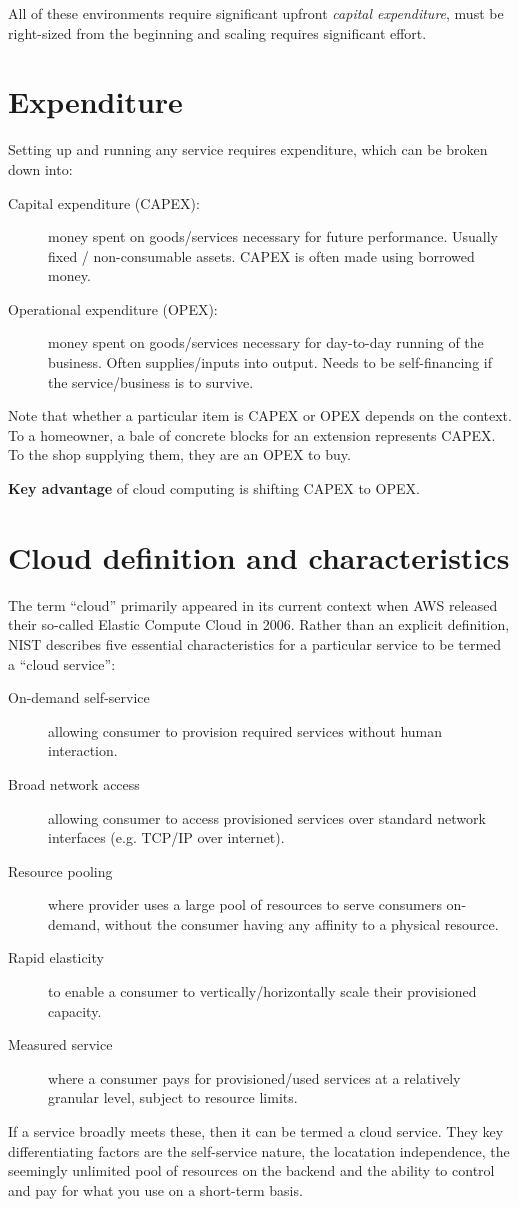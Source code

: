 \documentclass{pgnotes}
\begin{document}
All of these environments require significant upfront \textit{capital expenditure}, must be right-sized from the beginning and scaling requires significant effort.


\section{Expenditure}
\label{sec:expenditure}

Setting up and running any service requires expenditure, which can be broken down into: 
\begin{description}
\item[Capital expenditure (CAPEX):] money spent on goods/services necessary for future performance. Usually fixed / non-consumable assets. CAPEX is often made using borrowed money.
\item[Operational expenditure (OPEX):] money spent on goods/services necessary for day-to-day running of the business. Often supplies/inputs into output. Needs to be self-financing if the service/business is to survive.
\end{description}
Note that whether a particular item is CAPEX or OPEX depends on the context.
To a homeowner, a bale of concrete blocks for an extension represents CAPEX.
To the shop supplying them, they are an OPEX to buy.

\textbf{Key advantage} of cloud computing is shifting CAPEX to OPEX.


\section{Cloud definition and characteristics}
\label{sec:essential-characteristics}

The term ``cloud'' primarily appeared in its current context when AWS released their so-called Elastic Compute Cloud in 2006.
Rather than an explicit definition, NIST describes five essential characteristics for a particular service to be termed a ``cloud service'':
\begin{description}
\item[On-demand self-service] allowing consumer to provision required services without human interaction.
\item[Broad network access] allowing consumer to access provisioned services over standard network interfaces (e.g. TCP/IP over internet).
\item[Resource pooling] where provider uses a large pool of resources to serve consumers on-demand, without the consumer having any affinity to a physical resource.
\item[Rapid elasticity] to enable a consumer to vertically/horizontally scale their provisioned capacity.
\item[Measured service] where a consumer pays for provisioned/used services at a relatively granular level, subject to resource limits.
\end{description}
If a service broadly meets these, then it can be termed a cloud service.
They key differentiating factors are the self-service nature, the locatation independence, the seemingly unlimited pool of resources on the backend and the ability to control and pay for what you use on a short-term basis.
\end{document}
